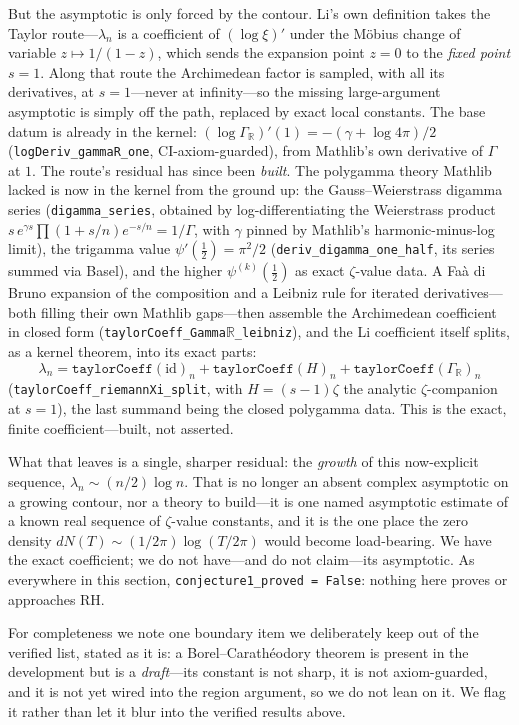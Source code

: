 But the asymptotic is only forced by the contour. Li's own definition takes the
Taylor route---$\lambda_n$ is a coefficient of $(\log \xi)'$ under the M\"obius
change of variable $z \mapsto 1/(1-z)$, which sends the expansion point $z=0$ to
the \emph{fixed point} $s=1$. Along that route the Archimedean factor is sampled,
with all its derivatives, at $s=1$---never at infinity---so the missing
large-argument asymptotic is simply off the path, replaced by exact local
constants. The base datum is already in the kernel:
$(\log \Gamma_{\mathbb R})'(1) = -(\gamma + \log 4\pi)/2$
(\texttt{logDeriv\_gammaR\_one}, CI-axiom-guarded), from Mathlib's own derivative
of $\Gamma$ at $1$. The route's residual has since been \emph{built}. The polygamma theory Mathlib
lacked is now in the kernel from the ground up: the Gauss--Weierstrass digamma
series (\texttt{digamma\_series}, obtained by log-differentiating the Weierstrass
product $s\,e^{\gamma s}\prod(1+s/n)e^{-s/n} = 1/\Gamma$, with $\gamma$ pinned by
Mathlib's harmonic-minus-log limit), the trigamma value $\psi'(\tfrac12) = \pi^2/2$
(\texttt{deriv\_digamma\_one\_half}, its series summed via Basel), and the higher
$\psi^{(k)}(\tfrac12)$ as exact $\zeta$-value data. A Fa\`a di Bruno expansion of
the composition and a Leibniz rule for iterated derivatives---both filling their
own Mathlib gaps---then assemble the Archimedean coefficient in closed form
(\texttt{taylorCoeff\_Gamma}\(\mathbb{R}\)\texttt{\_leibniz}), and the Li coefficient itself splits, as a
kernel theorem, into its exact parts:
\[
  \lambda_n = \texttt{taylorCoeff}(\mathrm{id})_n
    + \texttt{taylorCoeff}(H)_n
    + \texttt{taylorCoeff}(\Gamma_{\mathbb R})_n
\]
(\texttt{taylorCoeff\_riemannXi\_split}, with $H=(s-1)\zeta$ the analytic
$\zeta$-companion at $s=1$), the last summand being the closed polygamma data. This
is the exact, finite coefficient---built, not asserted.

What that leaves is a single, sharper residual: the \emph{growth} of this
now-explicit sequence, $\lambda_n \sim (n/2)\log n$. That is no longer an absent
complex asymptotic on a growing contour, nor a theory to build---it is one named
asymptotic estimate of a known real sequence of $\zeta$-value constants, and it is
the one place the zero density $dN(T) \sim (1/2\pi)\log(T/2\pi)$ would become
load-bearing. We have the exact coefficient; we do not have---and do not claim---its
asymptotic. As everywhere in this section, \texttt{conjecture1\_proved = False}:
nothing here proves or approaches RH.

For completeness we note one boundary item we deliberately keep out of the
verified list, stated as it is: a Borel--Carath\'eodory theorem is present in the
development but is a \emph{draft}---its constant is not sharp, it is not
axiom-guarded, and it is not yet wired into the region argument, so we do not lean
on it. We flag it rather than let it blur into the verified results above.

